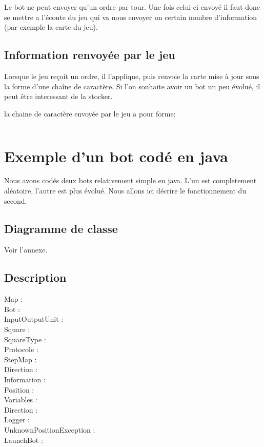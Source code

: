 Le bot ne peut envoyer qu'un ordre par tour. Une fois celui-ci envoyé il faut donc se mettre a l'écoute du jeu qui va nous envoyer un certain nombre d'information (par exemple la carte du jeu).

\subsection{Information renvoyée par le jeu}
Lorsque le jeu reçoit un ordre, il l'applique, puis renvoie la carte mise à jour sous la forme d'une chaîne de caractère. Si l'on souhaite avoir un bot un peu évolué, il peut être interessant de la stocker. 

la chaine de caractère envoyée par le jeu a pour forme:
\begin{verbatim}

\end{verbatim}

\section{Exemple d'un bot codé en java}

Nous avons codés deux bots relativement simple en java. L'un est completement aléatoire, l'autre est plus évolué. Nous allons ici décrire le fonctionnement du second.

\subsection{Diagramme de classe}

Voir l'annexe.
 
\subsection{Description }

\begin{description}
\item[Map :]
\item[Bot :]
\item[InputOutputUnit :]
\item[Square :]
\item[SquareType :]
\item[Protocole :]
\item[StepMap :]
\item[Direction :]
\item[Information :]
\item[Position :]
\item[Variables :]
\item[Direction :]
\item[Logger :]
\item[UnknownPositionException :]
\item[LaunchBot :]

\end{description} 

